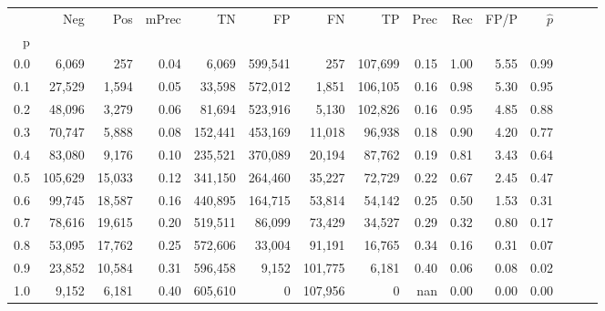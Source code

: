 \begin{tabular}{rrrrrrrrrrrrrrr}
\toprule
{} &      Neg &     Pos & mPrec &       TN &       FP &       FN &       TP &  Prec &   Rec &  FP/P & $\hat{p}$ \\
p   &          &         &       &          &          &          &          &       &       &       &           \\
\midrule
0.0 &    6,069 &     257 &  0.04 &    6,069 &  599,541 &      257 &  107,699 &  0.15 &  1.00 &  5.55 &      0.99 \\
0.1 &   27,529 &   1,594 &  0.05 &   33,598 &  572,012 &    1,851 &  106,105 &  0.16 &  0.98 &  5.30 &      0.95 \\
0.2 &   48,096 &   3,279 &  0.06 &   81,694 &  523,916 &    5,130 &  102,826 &  0.16 &  0.95 &  4.85 &      0.88 \\
0.3 &   70,747 &   5,888 &  0.08 &  152,441 &  453,169 &   11,018 &   96,938 &  0.18 &  0.90 &  4.20 &      0.77 \\
0.4 &   83,080 &   9,176 &  0.10 &  235,521 &  370,089 &   20,194 &   87,762 &  0.19 &  0.81 &  3.43 &      0.64 \\
0.5 &  105,629 &  15,033 &  0.12 &  341,150 &  264,460 &   35,227 &   72,729 &  0.22 &  0.67 &  2.45 &      0.47 \\
0.6 &   99,745 &  18,587 &  0.16 &  440,895 &  164,715 &   53,814 &   54,142 &  0.25 &  0.50 &  1.53 &      0.31 \\
0.7 &   78,616 &  19,615 &  0.20 &  519,511 &   86,099 &   73,429 &   34,527 &  0.29 &  0.32 &  0.80 &      0.17 \\
0.8 &   53,095 &  17,762 &  0.25 &  572,606 &   33,004 &   91,191 &   16,765 &  0.34 &  0.16 &  0.31 &      0.07 \\
0.9 &   23,852 &  10,584 &  0.31 &  596,458 &    9,152 &  101,775 &    6,181 &  0.40 &  0.06 &  0.08 &      0.02 \\
1.0 &    9,152 &   6,181 &  0.40 &  605,610 &        0 &  107,956 &        0 &   nan &  0.00 &  0.00 &      0.00 \\
\bottomrule
\end{tabular}
